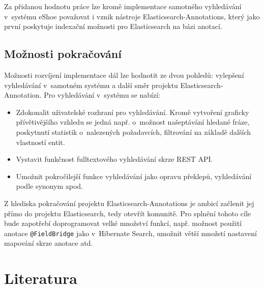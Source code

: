 \documentclass[11pt,oneside]{fithesis2}
\begin{document}
Za přidanou hodnotu práce lze kromě implementace samotného vyhledávání v~systému eShoe považovat i vznik nástroje Elasticsearch-Annotations, který jako první poskytuje indexační možnosti pro Elasticsearch na bázi anotací.

\section{Možnosti pokračování}
Možnosti rozvíjení implementace dál lze hodnotit ze dvou pohledů: vylepšení vyhledávání v~samotném systému a další směr projektu Elasticsearch-Annotation. Pro vyhledávání v~systému se nabízí:
\begin{itemize}
	\item Zdokonalit uživatelské rozhraní pro vyhledávání. Kromě vytvoření graficky přívětivějšího vzhledu se jedná např. o~možnost našeptávání hledané fráze, poskytnutí statistik o~nalezených požadavcích, filtrování na základě dalších vlastností entit.
	\item Vystavit funkčnost fulltextového vyhledávání skrze REST API.
	\item Umožnit pokročilejší funkce vyhledávání jako opravu překlepů, vyhledávání podle synonym apod.
\end{itemize}

Z hlediska pokračování projektu Elasticsearch-Annotations je ambicí začlenit jej přímo do projektu Elasticsearch, tedy otevřít komunitě. Pro splnění tohoto cíle bude zapotřebí doprogramovat velké množství funkcí, např. možnost použití anotace \texttt{@FieldBridge} jako v~Hibernate Search, umožnit větší množstí nastavení mapování skrze anotace atd.



\printindex

\begingroup
\def\tmpchapter{0}
\renewcommand{\chaptername}{}
\renewcommand{\thechapter}{}
\chapter{Literatura}
\renewcommand{\chapter}[2]{}%
\end{document}
